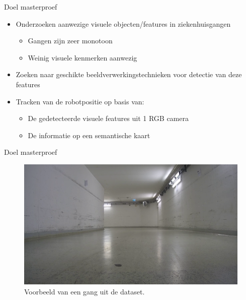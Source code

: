 \documentclass[11pt,t]{beamer}
\begin{document}
\begin{frame}[fragile]{Doel masterproef}
	\begin{itemize}
		\item Onderzoeken aanwezige visuele objecten/features in ziekenhuisgangen
		\begin{itemize}
			\item Gangen zijn zeer monotoon
			\item Weinig visuele kenmerken aanwezig
		\end{itemize}
		\item Zoeken naar geschikte beeldverwerkingstechnieken voor detectie van deze features
		\item Tracken van de robotpositie op basis van:
		\begin{itemize}
			\item De gedetecteerde visuele features uit 1 RGB camera
			\item De informatie op een semantische kaart
		\end{itemize}
	\end{itemize}
\end{frame}
\begin{frame}{Doel masterproef}
	\vspace{-12pt}
		\begin{figure}
			\centering
			\includegraphics[width=\textwidth]{graphics/gang.png}
			\caption{Voorbeeld van een gang uit de dataset.}
		\end{figure}
\end{frame}



\end{document}
